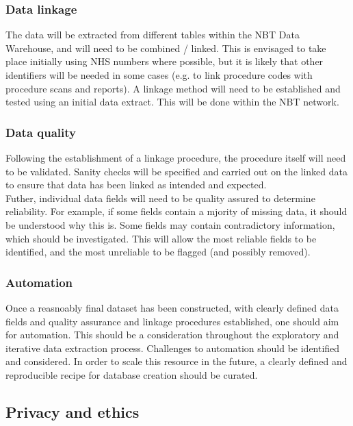 \documentclass{article}
\begin{document}
\subsubsection{Data linkage}

The data will be extracted from different tables within the NBT Data
Warehouse, and will need to be combined / linked. This is envisaged to
take place initially using NHS numbers where possible, but it is
likely that other identifiers will be needed in some cases (e.g. to
link procedure codes with procedure scans and reports). A linkage
method will need to be established and tested using an initial data
extract. This will be done within the NBT network.

\subsubsection{Data quality}

Following the establishment of a linkage procedure, the procedure
itself will need to be validated. Sanity checks will be specified and
carried out on the linked data to ensure that data has been linked as
intended and expected.\\

Futher, individual data fields will need to be quality assured to
determine reliability. For example, if some fields contain a mjority
of missing data, it should be understood why this is. Some fields may
contain contradictory information, which should be investigated. This
will allow the most reliable fields to be identified, and the most
unreliable to be flagged (and possibly removed).

\subsubsection{Automation}

Once a reasnoably final dataset has been constructed, with clearly defined
data fields and quality assurance and linkage procedures
established, one should aim for automation. This should be a
consideration throughout the exploratory and iterative data extraction
process. Challenges to automation should be identified and
considered. In order to scale this resource in the future, a clearly
defined and reproducible recipe for database creation should be
curated. 


\subsection{Privacy and ethics}
\end{document}
